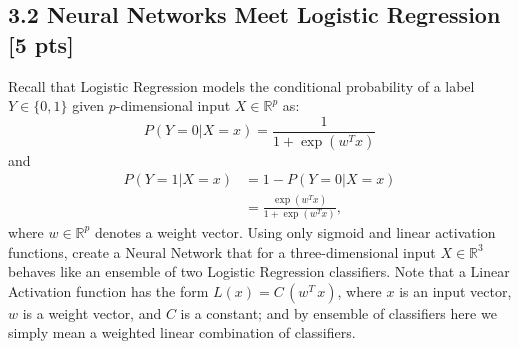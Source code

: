 \begin{soln}
\end{soln}

\subsection*{3.2 Neural Networks Meet Logistic Regression [5 pts]}
Recall that Logistic Regression models the conditional probability of a label $Y\in\{0,1\}$ given $p$-dimensional input $X\in\mathbb{R}^{p}$ as:
\begin{equation*} \label{eq:prob1}
P(Y=0|X=x)=\frac{1}{1 + \exp(w^T x)}
\end{equation*}
and
\begin{align*}
P(Y=1|X=x) &= 1- P(Y=0|X=x)\\
&= \frac{\exp(w^T x)}{1 + \exp(w^T x)},
\end{align*}
where $w\in \mathbb{R}^{p}$ denotes a weight vector.\newline\newline
Using only sigmoid and linear activation functions, create a Neural Network that for a three-dimensional input $X\in\mathbb{R}^{3}$  behaves like an ensemble of two Logistic Regression classifiers. Note that a Linear Activation function has the form $L(x) = C \, (w^T \, x)$, where $x$ is an input vector, $w$ is a weight vector, and $C$ is a constant; and by ensemble of classifiers here we simply mean a weighted linear combination of classifiers.

\begin{soln}
\end{soln}



